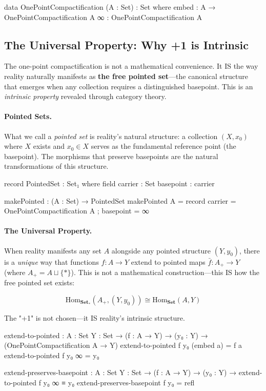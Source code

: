 \documentclass[11pt,a4paper]{book}
\begin{document}
\begin{code}
data OnePointCompactification (A : Set) : Set where
  embed : A → OnePointCompactification A
  ∞     : OnePointCompactification A

\end{code}

\subsection{The Universal Property: Why +1 is Intrinsic}

The one-point compactification is not a mathematical convenience. It IS the way reality 
naturally manifests as \textbf{the free pointed set}—the canonical structure that 
emerges when any collection requires a distinguished basepoint. This is an 
\emph{intrinsic property} revealed through category theory.

\paragraph{Pointed Sets.}
What we call a \emph{pointed set} is reality's natural structure: a collection $(X, x_0)$ 
where $X$ exists and $x_0 \in X$ serves as the fundamental reference point (the basepoint). 
The morphisms that preserve basepoints are the natural transformations of this structure.

\begin{code}
record PointedSet : Set₁ where
  field
    carrier   : Set
    basepoint : carrier

makePointed : (A : Set) → PointedSet
makePointed A = record { carrier = OnePointCompactification A ; basepoint = ∞ }
\end{code}

\paragraph{The Universal Property.}
When reality manifests any set $A$ alongside any pointed structure $(Y, y_0)$, there is a 
\emph{unique} way that functions $f : A \to Y$ extend to pointed maps $\bar{f} : A_+ \to Y$ 
(where $A_+ = A \sqcup \{*\}$). This is not a mathematical construction—this IS how 
the free pointed set exists:

\[
\text{Hom}_{\mathbf{Set}_*}(A_+, (Y, y_0)) \cong \text{Hom}_{\mathbf{Set}}(A, Y)
\]

The "+1" is not chosen—it IS reality's intrinsic structure.

\begin{code}
extend-to-pointed : {A : Set} {Y : Set} → (f : A → Y) → (y₀ : Y) 
                  → (OnePointCompactification A → Y)
extend-to-pointed f y₀ (embed a) = f a
extend-to-pointed f y₀ ∞         = y₀

extend-preserves-basepoint : {A : Set} {Y : Set} → (f : A → Y) → (y₀ : Y) 
                           → extend-to-pointed f y₀ ∞ ≡ y₀
extend-preserves-basepoint f y₀ = refl
\end{code}
\end{document}
